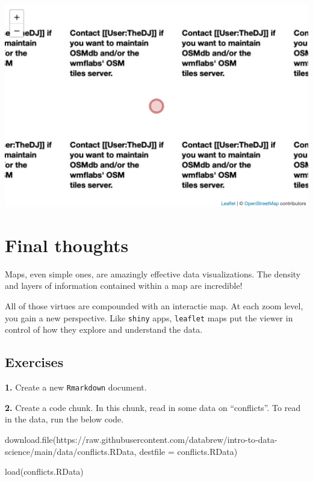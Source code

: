 \documentclass[
]{book}
\newenvironment{Shaded}{\begin{snugshade}}{\end{snugshade}}
\newcommand{\AttributeTok}[1]{\textcolor[rgb]{0.77,0.63,0.00}{#1}}
\newcommand{\FunctionTok}[1]{\textcolor[rgb]{0.00,0.00,0.00}{#1}}
\newcommand{\NormalTok}[1]{#1}
\newcommand{\StringTok}[1]{\textcolor[rgb]{0.31,0.60,0.02}{#1}}
\begin{document}
\includegraphics[width=694.08px]{figures/unnamed-chunk-238-1}

\hypertarget{final-thoughts-1}{%
\section*{Final thoughts}\label{final-thoughts-1}}

Maps, even simple ones, are amazingly effective data visualizations. The density and layers of information contained within a map are incredible!

All of those virtues are compounded with an interactie map. At each zoom level, you gain a new perspective. Like \texttt{shiny} apps, \texttt{leaflet} maps put the viewer in control of how they explore and understand the data.

\hypertarget{exercises-9}{%
\subsection*{Exercises}\label{exercises-9}}

\textbf{1.} Create a new \texttt{Rmarkdown} document.

\textbf{2.} Create a code chunk. In this chunk, read in some data on ``conflicts''. To read in the data, run the below code.

\begin{Shaded}
\begin{Highlighting}[]
\FunctionTok{download.file}\NormalTok{(}\StringTok{\textquotesingle{}https://raw.githubusercontent.com/databrew/intro{-}to{-}data{-}science/main/data/conflicts.RData\textquotesingle{}}\NormalTok{,}
              \AttributeTok{destfile =} \StringTok{\textquotesingle{}conflicts.RData\textquotesingle{}}\NormalTok{)}

\FunctionTok{load}\NormalTok{(}\StringTok{\textquotesingle{}conflicts.RData\textquotesingle{}}\NormalTok{)}
\end{Highlighting}
\end{Shaded}
\end{document}
